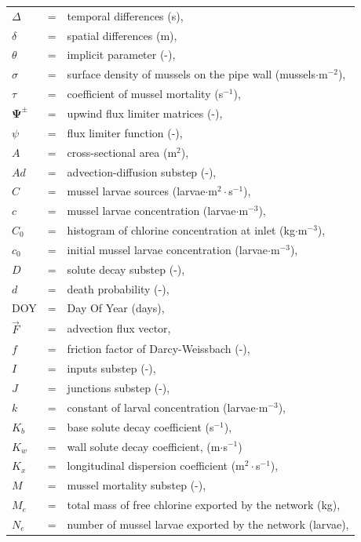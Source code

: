 \documentclass[review,authoryear]{elsarticle}
\begin{document}
{\tiny
\begin{tabular}{lcl}
$\Delta$ & = & temporal differences (s),\\
$\delta$ & = & spatial differences (m),\\
$\theta$ & = & implicit parameter (-),\\
$\sigma$ & = & surface density of mussels on the pipe wall
	(mussels$\cdot$m$^{-2}$),\\
$\tau$ & = & coefficient of mussel mortality (s$^{-1}$),\\
$\mathbf{\Psi}^\pm$ & = & upwind flux limiter matrices (-),\\
$\psi$ & = & flux limiter function (-),\\
$A$ & = & cross-sectional area (m$^2$),\\
$Ad$ & = & advection-diffusion substep (-),\\
$C$ & = & mussel larvae sources (larvae$\cdot$m$^2\cdot$s$^{-1}$),\\
$c$ & = & mussel larvae concentration (larvae$\cdot$m$^{-3}$),\\
$C_0$ & = & histogram of chlorine concentration at inlet (kg$\cdot$m$^{-3}$),\\
$c_0$ & = & initial mussel larvae concentration (larvae$\cdot$m$^{-3}$),\\
$D$ & = & solute decay substep (-),\\
$d$ & = & death probability (-),\\
DOY & = & Day Of Year (days),\\
$\vec{F}$ & = & advection flux vector,\\
$f$ & = & friction factor of Darcy-Weissbach (-),\\
$I$ & = & inputs substep (-),\\
$J$ & = & junctions substep (-),\\
$k$ & = & constant of larval concentration (larvae$\cdot$m$^{-3}$),\\
$K_b$ & = & base solute decay coefficient (s$^{-1}$),\\
$K_w$ & = & wall solute decay coefficient, (m$\cdot$s$^{-1}$)\\
$K_x$ & = & longitudinal dispersion coefficient (m$^2\cdot$s$^{-1}$),\\
$M$ & = & mussel mortality substep (-),\\
$M_e$ & = & total mass of free chlorine exported by the network (kg),\\
$N_e$ & = & number of mussel larvae exported by the network (larvae),\\

\end{tabular}}
\end{document}
